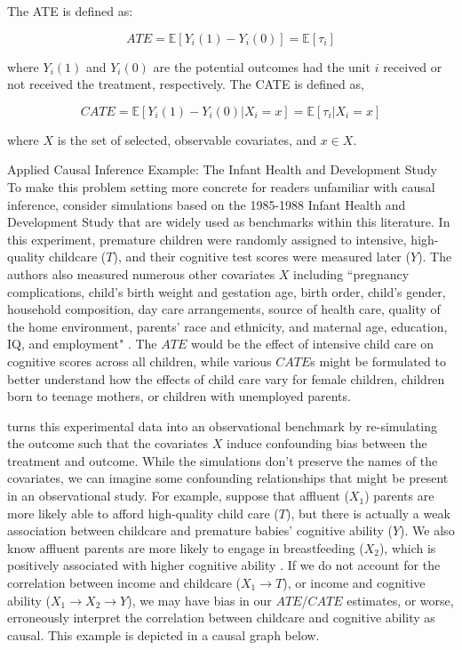 The ATE is defined as:
 
$$ATE =\mathbb{E}[Y_i(1)-Y_i(0)] = \mathbb{E}[\tau_i]$$
 
where $Y_i(1)$ and $Y_i(0)$ are the potential outcomes had the unit $i$ received or not received the treatment, respectively. The CATE is defined as,

$$CATE =\mathbb{E}[Y_i(1)-Y_i(0)|X_i=x] = \mathbb{E}[\tau_i|X_i=x] $$
 
where $X$ is the set of selected, observable covariates, and $x \in X$.

\begin{TCBBox}[label=box:example]{Applied Causal Inference Example: The Infant Health and Development Study}
To make this problem setting more concrete for readers unfamiliar with causal inference, consider simulations based on the 1985-1988 Infant Health and Development Study that are widely used as benchmarks within this literature. In this experiment, premature children were randomly assigned to intensive, high-quality childcare ($T$), and their cognitive test scores were measured later ($Y$). The authors also measured numerous other covariates $X$ including ``pregnancy complications, child's birth weight and gestation age, birth order, child's gender, household composition, day care arrangements, source of health care, quality of the home environment, parents' race and ethnicity, and maternal age, education, IQ, and employment" \citep{gross1993infant}. The $ATE$ would be the effect of intensive child care on cognitive scores across all children, while various $CATE$s might be formulated to better understand how the effects of child care vary for female children, children born to teenage mothers, or children with unemployed parents.   

\citet{Hill2011} turns this experimental data into an observational benchmark by re-simulating the outcome such that the covariates $X$ induce confounding bias between the treatment and outcome. While the simulations don't preserve the names of the covariates, we can imagine some confounding relationships that might be present in an observational study. For example, suppose that affluent ($X_1$) parents are more likely able to afford high-quality child care ($T$), but there is actually a weak association between childcare and premature babies' cognitive ability ($Y$). We also know affluent parents are more likely to engage in breastfeeding ($X_2$), which is positively associated with higher cognitive ability \citep{heck2006socioeconomic,kramer2008breastfeeding}. If we do not account for the correlation between income and childcare ($X_1 \rightarrow T$), or income and cognitive ability ($X_1 \rightarrow X_2 \rightarrow Y$), we may have bias in our $ATE$/$CATE$ estimates, or worse, erroneously interpret the correlation between childcare and cognitive ability as causal. This example is depicted in a causal graph below.


\end{TCBBox}
